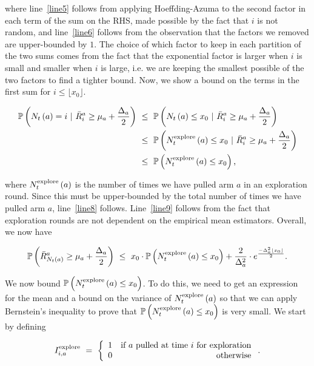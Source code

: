 \documentclass[11pt]{article}
\begin{document}
\noindent where line~\ref{line5} follows from applying Hoeffding-Azuma to the second factor in each term of the sum on the RHS, made possible by the fact that $i$ is not random, and line~\ref{line6} follows from the observation that the factors we removed are upper-bounded by $1$. The choice of which factor to keep in each partition of the two sums comes from the fact that the exponential factor is larger when $i$ is small and smaller when $i$ is large, i.e. we are keeping the smallest possible of the two factors to find a tighter bound. Now, we show a bound on the terms in the first sum for $i \leq \lfloor x_0 \rfloor$.

\begin{align}
	\prob{N_t \left( a \right) = i\ |\ \bar{R}_i^a \geq \mu_a + \frac{\Delta_a}{2}}\ &\leq\ \prob{N_t \left( a \right) \leq x_0\ |\ \bar{R}_i^a \geq \mu_a + \frac{\Delta_a}{2}} \label{line7}\\
	&\leq\ \prob{N_t^{\textnormal{explore}} \left( a \right) \leq x_0\ |\ \bar{R}_i^a \geq \mu_a + \frac{\Delta_a}{2}} \label{line8}\\
	&\leq\ \prob{N_t^{\textnormal{explore}} \left( a \right) \leq x_0} \textnormal{,} \label{line9}
\end{align}

\noindent where $N_t^{\textnormal{explore}} \left( a \right)$ is the number of times we have pulled arm $a$ in an exploration round. Since this must be upper-bounded by the total number of times we have pulled arm $a$, line~\ref{line8} follows. Line~\ref{line9} follows from the fact that exploration rounds are not dependent on the empirical mean estimators. Overall, we now have

\begin{align}
	\mathbb{P}\left( \bar{R}_{N_t\left( a \right)}^a \geq \mu_a + \frac{\Delta_a}{2} \right)\ \leq\ x_0 \cdot \mathbb{P}\left( N_t^{\textnormal{explore}} \left( a \right) \leq x_0 \right) + \frac{2}{\Delta_a^2} \cdot e^{\frac{-\Delta_a^2 \lfloor x_0 \rfloor}{2}} \textnormal{.} \label{line10}
\end{align}

\noindent We now bound $\mathbb{P}\left( N_t^{\textnormal{explore}} \left( a \right) \leq x_0 \right)$. To do this, we need to get an expression for the mean and a bound on the variance of $N_t^{\textnormal{explore}} \left( a \right)$ so that we can apply Bernstein's inequality to prove that $\mathbb{P}\left( N_t^{\textnormal{explore}} \left( a \right) \leq x_0 \right)$ is very small. We start by defining 

\begin{align}
	I_{i,a}^{\textnormal{explore}}\ =\ \left \{ \begin{array}{l r}
	1 & \textnormal{if } a \textnormal{ pulled at time } i \textnormal{ for exploration}\\
	0 & \textnormal{otherwise}
	\end{array} \right. \textnormal{.}
\end{align} 
\end{document}
